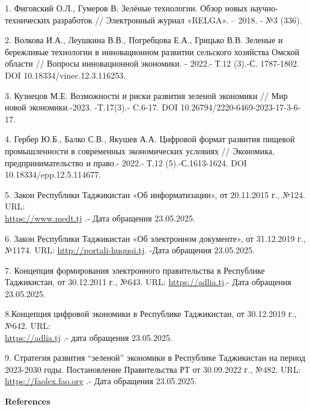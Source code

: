 \begin{references}
1. Фиговский О.Л., Гумеров В. Зелёные технологии. Обзор новых
научно-технических разработок // Электронный журнал «RELGA». -- 2018. -
№3 (336).

2. Волкова И.А., Леушкина В.В., Погребцова Е.А., Грицько В.В. Зеленые и
бережливые технологии в инновационном развитии сельского хозяйства
Омской области // Вопросы инновационной экономики. - 2022.- Т.12 (3).-С.
1787-1802. DOI 10.18334/vinec.12.3.116253.

3. Кузнецов М.Е. Возможности и риски развития зеленой экономики // Мир
новой экономики.-2023. -T.17(3).- C.6-17. DOI
10.26794/2220-6469-2023-17-3-6-17.

4. Гербер Ю.Б., Балко С.В., Якушев А.А. Цифровой формат развития пищевой
промышленности в современных экономических условиях // Экономика,
предпринимательство и право.- 2022.- Т.12 (5).-С.1613-1624. DOI
10.18334/epp.12.5.114677.

5. Закон Республики Таджикистан «Об информатизации», от 20.11.2015 г.,
№124. URL:\\
\href{https://www.medt.tj/documents/main/normativno-pravovie-akti/zakonodatelnie-akti/ru/02518-ru.pdf}{https://www.medt.tj} .-
Дата обращения 23.05.2025.

6. Закон Республики Таджикистан «Об электронном документе», от 31.12.2019
г., №1174. URL:
\href{http://portali-huquqi.tj/publicadliya/view_qonunhoview.php?showdetail=&asosi_id=1763}{http://portali-huquqi.tj}.
-Дата обращения 23.05.2025.

7. Концепция формирования электронного правительства в Республике
Таджикистан, от 30.12.2011 г., №643. URL:
\href{https://adlia.tj/show_doc.fwx?rgn=116092}{https://adlia.tj}.- Дата обращения
23.05.2025.

8.Концепция цифровой экономики в Республике Таджикистан, от 30.12.2019
г., №642. URL: \\\href{https://adlia.tj/show_doc.fwx?rgn=135392}{https://adlia.tj} .- дата
обращения 23.05.2025.

9. Стратегия развития ``зеленой'' экономики в Республике Таджикистан на
период 2023-2030 годы. Постановление Правительства РТ от 30.09.2022 г.,
№482. URL: \href{https://faolex.fao.org/docs/pdf/taj221507.pdf}{https://faolex.fao.org} .- Дата
обращения 23.05.2025.
\end{references}

\begin{center}
{\bfseries References}
\end{center}

